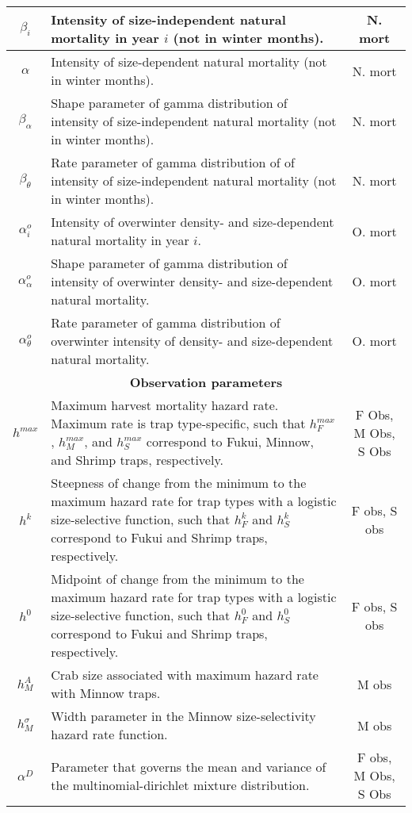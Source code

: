 \documentclass{article}
\begin{document}
\begin{longtable}{||c p{9cm} c||}
 \hline
 $\beta_i$ & Intensity of size-independent natural mortality in year $i$ (not in winter months). & N. mort \\ 
 \hline
 $\alpha$ & Intensity of size-dependent natural mortality (not in winter months). & N. mort \\ 
 \hline
 $\beta_{\alpha}$ & Shape parameter of gamma distribution of intensity of size-independent natural mortality (not in winter months). & N. mort \\ 
 \hline
 $\beta_{\theta}$ & Rate parameter of gamma distribution of of intensity of size-independent natural mortality (not in winter months). & N. mort \\ 
 \hline
 $\alpha^o_i$ & Intensity of overwinter density- and size-dependent natural mortality in year $i$. & O. mort \\ 
 \hline
 $\alpha^o_{\alpha}$ & Shape parameter of gamma distribution of intensity of overwinter density- and size-dependent natural mortality. & O. mort \\ 
 \hline
 $\alpha^o_{\theta}$ & Rate parameter of gamma distribution of overwinter intensity of density- and size-dependent natural mortality. & O. mort \\ 
 \hline\hline
 \multicolumn{3}{||c||}{\textbf{Observation parameters}} \\ 
 \hline
 $h^{max}$ & Maximum harvest mortality hazard rate. Maximum rate is trap type-specific, such that $h_F^{max}$, $h_M^{max}$, and $h_S^{max}$ correspond to Fukui, Minnow, and Shrimp traps, respectively. & F Obs, M Obs, S Obs \\ 
 \hline
 $h^{k}$ & Steepness of change from the minimum to the maximum hazard rate for trap types with a logistic size-selective function, such that $h_F^{k}$ and $h_S^{k}$ correspond to Fukui and Shrimp traps, respectively. & F obs, S obs \\ 
 \hline
 $h^{0}$ & Midpoint of change from the minimum to the maximum hazard rate for trap types with a logistic size-selective function, such that $h_F^{0}$ and $h_S^{0}$ correspond to Fukui and Shrimp traps, respectively. & F obs, S obs \\ 
 \hline
 $h_M^{A}$ & Crab size associated with maximum hazard rate with Minnow traps. & M obs \\ 
 \hline
 $h_M^{\sigma}$ & Width parameter in the Minnow size-selectivity hazard rate function. & M obs \\ 
 \hline
 $\alpha^D$ & Parameter that governs the mean and variance of the multinomial-dirichlet mixture distribution. & F obs, M Obs, S Obs \\

\end{longtable}
\end{document}

